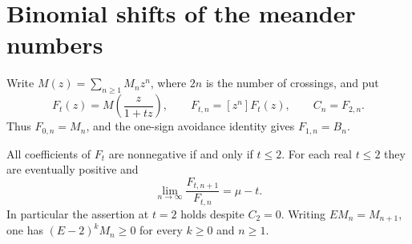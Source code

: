 \section{Binomial shifts of the meander numbers}\label{sec:idle-moves}

Write \(M(z)=\sum_{n\ge1}M_nz^n\), where \(2n\) is the number of
crossings, and put
\[
     F_t(z)=M\!\left(\frac{z}{1+tz}\right),\qquad
     F_{t,n}=[z^n]F_t(z),\qquad C_n=F_{2,n}.
\]
Thus \(F_{0,n}=M_n\), and the one-sign avoidance identity gives
\(F_{1,n}=B_n\).

\begin{theorem}\label{thm:idle-shifts}
All coefficients of \(F_t\) are nonnegative if and only if \(t\le2\).
For each real \(t\le2\) they are eventually positive and
\[
       \lim_{n\to\infty}\frac{F_{t,n+1}}{F_{t,n}}=\mu-t .
\]
In particular the assertion at \(t=2\) holds despite \(C_2=0\).
Writing \(E M_n=M_{n+1}\), one has
\((E-2)^kM_n\ge0\) for every \(k\ge0\) and \(n\ge1\).
\end{theorem}

